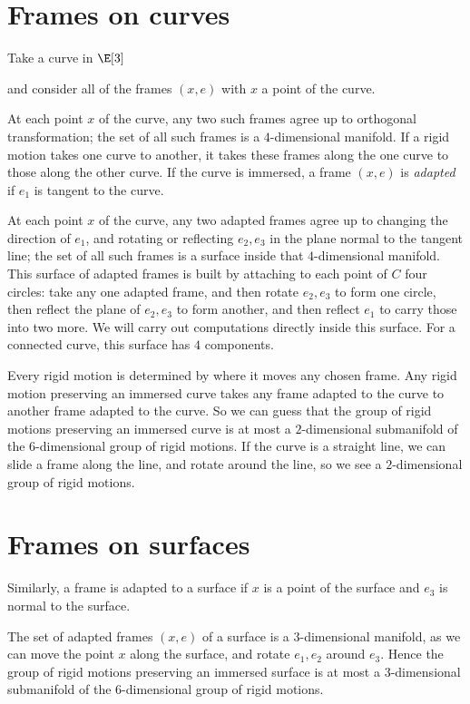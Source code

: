 \section{Frames on curves}
Take a curve in \(\E[3]\)
\begin{center}

\end{center}
and consider all of the frames \((x,e)\) with \(x\) a point of the curve.
\begin{center}

\end{center}
At each point \(x\) of the curve, any two such frames agree up to orthogonal transformation; the set of all such frames is a \(4\)-dimensional manifold.
If a rigid motion takes one curve to another, it takes these frames along the one curve to those along the other curve.
If the curve is immersed, a frame \((x,e)\) is \emph{adapted} if \(e_1\) is tangent to the curve.
\begin{center}

\end{center}
At each point \(x\) of the curve, any two adapted frames agree up to changing the direction of \(e_1\), and rotating or reflecting \(e_2,e_3\) in the plane normal to the tangent line; the set of all such frames is a surface inside that \(4\)-dimensional manifold.
This surface of adapted frames is built by attaching to each point of \(C\) four circles: take any one adapted frame, and then rotate \(e_2,e_3\) to form one circle, then reflect the plane of \(e_2,e_3\) to form another, and then reflect \(e_1\) to carry those into two more.
We will carry out computations directly inside this surface.
For a connected curve, this surface has \(4\) components.

Every rigid motion is determined by where it moves any chosen frame.
Any rigid motion preserving an immersed curve takes any frame adapted to the curve to another frame adapted to the curve.
So we can guess that the group of rigid motions preserving an immersed curve is at most a \(2\)-dimensional submanifold of the \(6\)-dimensional group of rigid motions.
If the curve is a straight line, we can slide a frame along the line, and rotate around the line, so we see a \(2\)-dimensional group of rigid motions.

\section{Frames on surfaces}
Similarly, a frame is adapted to a surface if \(x\) is a point of the surface and \(e_3\) is normal to the surface.
\begin{center}

\end{center}
The set of adapted frames \((x,e)\) of a surface is a \(3\)-dimensional manifold, as we can move the point \(x\) along the surface, and rotate \(e_1,e_2\) around \(e_3\).
Hence the group of rigid motions preserving an immersed surface is at most a \(3\)-dimensional submanifold of the \(6\)-dimensional group of rigid motions.

